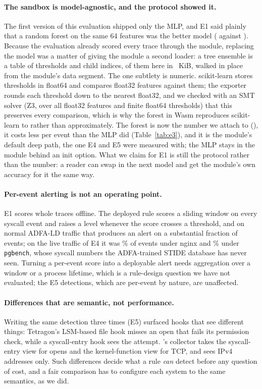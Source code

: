 \paragraph{The sandbox is model-agnostic, and the protocol showed it.}
The first version of this evaluation shipped only the MLP, and E1 said
plainly that a random forest on the same 64 features was the better model
(\eOneAuprcRf{} against \eOneAuprcMlp{}). Because the evaluation already
scored every trace through the module, replacing the model was a matter of
giving the module a second loader: a tree ensemble is a table of thresholds
and child indices, \rfNodes{} of them here in \rfKiB{}~KiB, walked in
place from the module's data segment. The one subtlety is numeric.
scikit-learn stores thresholds in float64 and compares float32 features
against them; the exporter rounds each threshold down to the nearest
float32, and we checked with an SMT solver (Z3, over all float32 features
and finite float64 thresholds) that this preserves every comparison, which
is why the forest in Wasm reproduces scikit-learn to
\eOneWasmSklearnMaxDiff{} rather than approximately. The forest is now the
number we attach to \sys (\eOneAuprcRfWasm{}), it costs less per event
than the MLP did (Table~\ref{tab:e3}), and it is the module's default deep
path, the one E4 and E5 were measured with; the MLP stays in the module
behind an init option. What we claim for
E1 is still the protocol rather than the number: a reader can swap in the
next model and get the module's own accuracy for it the same way.

\paragraph{Per-event alerting is not an operating point.}
E1 scores whole traces offline. The deployed rule scores a sliding window
on every syscall event and raises a level whenever the score crosses a
threshold, and on normal ADFA-LD traffic that produces an alert on a
substantial fraction of events; on the live traffic of E4 it was
\eFourWsAlertPctNginx{}\% of events under nginx and \eFourWsAlertPctPg{}\%
under \texttt{pgbench}, whose syscall numbers the ADFA-trained STIDE
database has never seen. Turning a per-event score into a
deployable alert needs aggregation over a window or a process lifetime,
which is a rule-design question we have not evaluated; the E5 detections,
which are per-event by nature, are unaffected.

\paragraph{Differences that are semantic, not performance.}
Writing the same detection three times (E5) surfaced hooks that see
different things: Tetragon's LSM-based file hook misses an open that fails
its permission check, while a syscall-entry hook sees the attempt. \sys's
collector takes the syscall-entry view for opens and the kernel-function
view for TCP, and sees IPv4 addresses only. Such differences decide what a
rule \emph{can} detect before any question of cost, and a fair comparison
has to configure each system to the same semantics, as we did.

